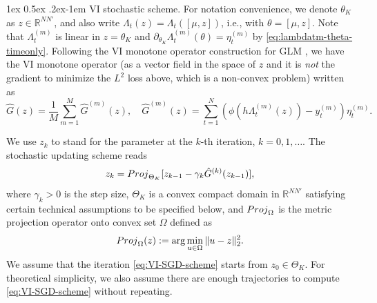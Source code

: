 \documentclass[11pt]{article}
\makeatletter
\newcommand{\xc}[1]{\textcolor{orange}{\textsf{XC: #1}}}
\theoremstyle{remark}
\theoremstyle{plain}
\newcommand{\R}{\mathbb{R}}
\renewcommand{\paragraph}{%
  \@startsection{paragraph}{4}%
  {\z@}{1ex \@plus 0.5ex \@minus .2ex}{-1em}%
  {\normalfont\normalsize\itshape}%
}
\makeatother
\begin{document}
\paragraph{VI stochastic scheme.}
For notation convenience, we denote $\theta_K$ as $z \in \R^{N N'}$, and also write 
$\Lambda_t( z) = \Lambda_t( [\mu, z])$, i.e., with $\theta = [\mu, z]$.
Note that $\Lambda_t^{(m)}$ is linear in $z=\theta_K$
and $\partial_{\theta_K} \Lambda_t^{(m)}(\theta) = \eta_t^{(m)}$ by \eqref{eq:lambdatm-theta-timeonly}.
Following the VI monotone operator construction for GLM \cite{juditsky2020convex}, 
we have the VI monotone operator 
(as a vector field in the space of $z$ and it is {\it not} the gradient to minimize the $L^2$ loss above, which is a non-convex problem) 
written as 
\begin{equation}\label{eq:formula-Gtheta-timeonly}
\hat G( z ) =  
 \frac{1}{M} \sum_{m=1}^M 
 \hat G^{(m)}( z ),
 \quad 
 \hat G^{(m)}( z ) = 
\sum_{t=1}^N \left(\phi( h \Lambda_t^{(m)}( z )) - y_t^{(m)} \right) \eta_t^{(m)}.
\end{equation}


We use $z_k$ to stand for the parameter at the $k$-th iteration, $k=0,1, \ldots$.
The stochastic updating scheme reads %
\begin{equation}\label{eq:VI-SGD-scheme}
z_k = {\rm Proj}_{\Theta_K} [ z_{k-1} - \gamma_k \hat G^{(k)} (z_{k-1}) ],
\end{equation}
where  $\gamma_k > 0 $ is the step size,
$\Theta_K$ is a convex compact domain in $\R^{N N'}$ satisfying certain technical assumptions to be specified below, and ${\rm Proj}_{\Omega}$ is the metric projection operator onto convex set $\Omega$ defined as 
\begin{equation}\label{eq:def-proj-operator}
{\rm Proj}_{\Omega} (z) : = \arg\min_{ u \in \Omega} \| u - z\|_2^2.
\end{equation}
We assume that the iteration \eqref{eq:VI-SGD-scheme} starts from $z_0 \in \Theta_K$.
For theoretical simplicity, we also assume there are enough trajectories to compute \eqref{eq:VI-SGD-scheme} without repeating. 
\end{document}
